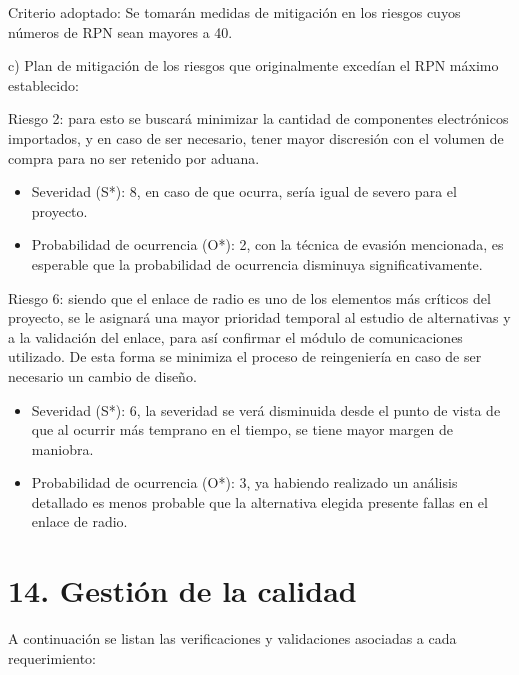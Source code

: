 \documentclass[
11pt, %
codirector, %
]{charter}
\begin{document}
Criterio adoptado: 
Se tomarán medidas de mitigación en los riesgos cuyos números de RPN sean mayores a 40.

c) Plan de mitigación de los riesgos que originalmente excedían el RPN máximo establecido:
 
Riesgo 2: para esto se buscará minimizar la cantidad de componentes electrónicos importados, y en caso de ser necesario, tener mayor discresión con el volumen de compra para no ser retenido por aduana.
\begin{itemize}
\item Severidad (S*): 8, en caso de que ocurra, sería igual de severo para el proyecto.
\item Probabilidad de ocurrencia (O*): 2, con la técnica de evasión mencionada, es esperable que la probabilidad de ocurrencia disminuya significativamente.
\end{itemize}


Riesgo 6: siendo que el enlace de radio es uno de los elementos más críticos del proyecto, se le asignará una mayor prioridad temporal al estudio de alternativas y a la validación del enlace, para así confirmar el módulo de comunicaciones utilizado. De esta forma se minimiza el proceso de reingeniería en caso de ser necesario un cambio de diseño.

\begin{itemize}
\item Severidad (S*): 6, la severidad se verá disminuida desde el punto de vista de que al ocurrir más temprano en el tiempo, se tiene mayor margen de maniobra.
\item Probabilidad de ocurrencia (O*): 3, ya habiendo realizado un análisis detallado es menos probable que la alternativa elegida presente fallas en el enlace de radio.
\end{itemize}


\section{14. Gestión de la calidad}
\label{sec:calidad}

A continuación se listan las verificaciones y validaciones asociadas a cada requerimiento:
\end{document}
